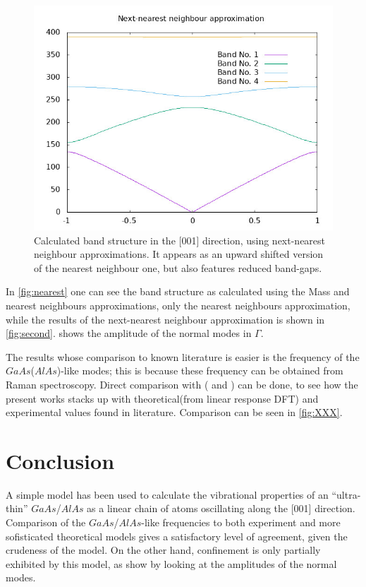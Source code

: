 \documentclass{article}
\begin{document}
\begin{figure}[ht]
	\centering
	\includegraphics[scale=0.3]{second.jpeg}
	\caption{Calculated band structure in the [001] direction, using next-nearest neighbour approximations. It appears as an upward shifted version of the nearest neighbour one, but also features reduced band-gaps.}
	\label{fig:second}
\end{figure}
In \autoref{fig:nearest} one can see the band structure as calculated using the Mass and nearest neighbours approximations, only the nearest neighbours approximation, while the results of the next-nearest neighbour approximation is shown in \autoref{fig:second}. \cite[Fig ]{Molinari} shows the amplitude of the normal modes in $\Gamma$.\par
The results whose comparison to known literature is easier is the frequency of the $GaAs$($AlAs$)-like modes; this is because these frequency can be obtained from Raman spectroscopy. Direct comparison with (\cite[Fig.6]{Molinari} and \cite{Cardona}) can be done, to see how the present works stacks up with theoretical(from linear response DFT)  and experimental values found in literature. Comparison can be seen in \ref{fig:XXX}.\\

\section{Conclusion}
A simple model has been used to calculate the vibrational properties of an “ultra-thin” $GaAs$/$AlAs$ as a linear chain of atoms oscillating along the [001] direction.\\
Comparison of the $GaAs$/$AlAs$-like frequencies to both experiment and more sofisticated theoretical models gives a satisfactory level of agreement, given the crudeness of the model. On the other hand, confinement is only partially exhibited by this model, as show by looking at the amplitudes of the normal modes.
\end{document}
